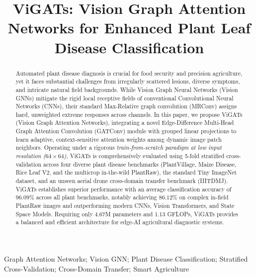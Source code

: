 \documentclass[]{interact}
\theoremstyle{plain}
\theoremstyle{definition}
\theoremstyle{remark}
\begin{document}

\title{ViGATs: Vision Graph Attention Networks for Enhanced Plant Leaf Disease Classification}

\author{
}

\maketitle

\begin{abstract}
Automated plant disease diagnosis is crucial for food security and precision agriculture, yet it faces substantial challenges from irregularly scattered lesions, diverse symptoms, and intricate natural field backgrounds. While Vision Graph Neural Networks (Vision GNNs) mitigate the rigid local receptive fields of conventional Convolutional Neural Networks (CNNs), their standard Max-Relative graph convolution (MRConv) assigns hard, unweighted extreme responses across channels. In this paper, we propose ViGATs (Vision Graph Attention Networks), integrating a novel Edge-Difference Multi-Head Graph Attention Convolution (GATConv) module with grouped linear projections to learn adaptive, context-sensitive attention weights among dynamic image patch neighbors. Operating under a rigorous \emph{train-from-scratch paradigm at low input resolution ($64 \times 64$)}, ViGATs is comprehensively evaluated using 5-fold stratified cross-validation across four diverse plant disease benchmarks (PlantVillage, Maize Disease, Rice Leaf V2, and the multicrop in-the-wild PlantRaw), the standard Tiny ImageNet dataset, and an unseen aerial drone cross-domain transfer benchmark (IIITDMJ). ViGATs establishes superior performance with an average classification accuracy of $96.09\%$ across all plant benchmarks, notably achieving $86.12\%$ on complex in-field PlantRaw images and outperforming modern CNNs, Vision Transformers, and State Space Models. Requiring only 4.67M parameters and 1.13 GFLOPs, ViGATs provides a balanced and efficient architecture for edge-AI agricultural diagnostic systems.
\end{abstract}

\begin{keywords}
Graph Attention Networks; Vision GNN; Plant Disease Classification; Stratified Cross-Validation; Cross-Domain Transfer; Smart Agriculture
\end{keywords}
\end{document}
